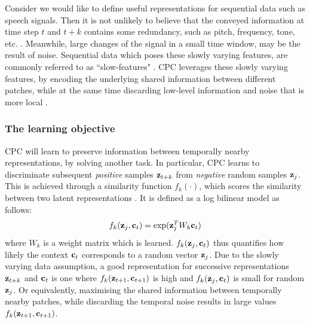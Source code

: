 	Consider we would like to define useful representations for sequential data such as speech signals. Then it is not unlikely to believe that the conveyed information at time step $t$ and $t+k$ contains some redundancy, such as pitch, frequency, tone, etc. \citep{raoUnderstandingGradientIsolatedLearning2020}. Meanwhile, large changes of the signal in a small time window, may be the result of noise. Sequential data which poses these slowly varying features, are commonly referred to as ``slow-features" \citep{zhangSlowFeatureAnalysis2012}. CPC leverages these slowly varying features, by encoding the underlying shared information between different patches, while at the same time discarding low-level information and noise that is more local \citep{oordRepresentationLearningContrastive2019}.


\subsubsection{The learning objective}
	
	
	CPC will learn to preserve information between temporally nearby representations, by solving another task. In particular, CPC learns to discriminate subsequent \textit{positive} samples $\mathbf{z}_{t+k}$ from \textit{negative} random samples $\mathbf{z}_j$. This is achieved through a similarity function $f_k(\cdot)$, which scores the similarity between two latent representations \citep{lowePuttingEndEndtoEnd2020}. It is defined as a log bilinear model as follows:
	\begin{equation} %
		\fkdefinition \label{eq:fk}
	\end{equation}
	where $W_k$ is a weight matrix which is learned. $f_k( \mathbf{z}_j , \mathbf{c}_t )$ thus quantifies how likely the context $\mathbf{c}_t$ corresponds to a random vector $\mathbf{z}_j$. Due to the slowly varying data assumption, a good representation for successive representations $\mathbf{z}_{t+k}$ and $\mathbf{c}_t$ is one where $f_k( \mathbf{z}_{t+1}, \mathbf{c}_{t+1})$ is high and $f_k( \mathbf{z}_j, \mathbf{c}_t)$ is small for random $\mathbf{z}_j$. Or equivalently, maximising the shared information between temporally nearby patches, while discarding the temporal noise results in large values $f_k( \mathbf{z}_{t+1}, \mathbf{c}_{t+1})$.
	
